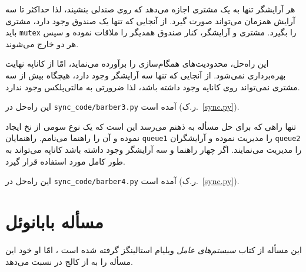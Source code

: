 \documentclass{book}
\newcommand{\clearemptydoublepage}{\newpage\cleardoublepage}
\begin{document}
    هر آرایشگر تنها به یک مشتری اجازه می‌دهد که روی صندلی بنشیند، لذا حداکثر تا سه آرایش همزمان می‌تواند صورت گیرد. از آنجایی که تنها یک صندوق وجود 
    دارد، مشتری باید  {\tt mutex} را بگیرد. مشتری و آرایشگر، کنار صندوق همدیگر را ملاقات نموده و سپس هر دو خارج می‌شوند. 

    این راه‌حل،‌ محدودیت‌های همگام‌سازی را برآورده می‌نماید،‌ امّا از کاناپه نهایت بهره‌برداری نمی‌شود. 
    از آنجایی که تنها سه آرایشگر وجود دارد، هیچگاه بیش از سه مشتری نمی‌تواند روی کاناپه وجود داشته باشد، لذا ضرورتی به مالتی‌پلکس وجود ندارد. 

    این راه‌حل در \verb"sync_code/barber3.py" آمده است (ر.ک.~\ref{sync.py}).


    تنها راهی که برای حل مسأله به ذهنم می‌رسد این است که یک نوع سومی از نخ ایجاد نموده و آن را راهنما می‌نامم. 
    راهنمایان {\tt queue1} را مدیریت نموده و آرایشگران {\tt queue2} را مدیریت می‌نمایند. اگر چهار راهنما و سه آرایشگر وجود داشته باشد 
    کاناپه می‌تواند به طور کامل مورد استفاده قرار گیرد. 

    این راه‌حل در \verb"sync_code/barber4.py" آمده است (ر.ک.~\ref{sync.py}).


\clearemptydoublepage
\section{مسأله بابانوئل}

    این مسأله از کتاب \emph{سیستم‌های عامل} ویلیام استالینگز گرفته شده است  \cite{stallings}، امّا او خود این مسأله را به 
    از کالج   در  نسبت می‌دهد. 

\end{document}
